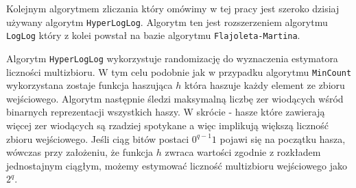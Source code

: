 Kolejnym algorytmem zliczania który omówimy w tej pracy jest szeroko dzisiaj używany algorytm \texttt{HyperLogLog}. Algorytm ten jest rozszerzeniem algorytmu \texttt{LogLog} który z kolei powstał na bazie algorytmu \texttt{Flajoleta-Martina}.

Algorytm \texttt{HyperLogLog} wykorzystuje randomizację do wyznaczenia estymatora liczności multizbioru. W tym celu podobnie jak w przypadku algorytmu \texttt{MinCount} wykorzystana zostaje funkcja haszująca $h$ która haszuje każdy element ze zbioru wejściowego. Algorytm następnie śledzi maksymalną liczbę zer wiodących wśród binarnych reprezentacji wszystkich haszy. W skrócie - hasze które zawierają więcej zer wiodących są rzadziej spotykane a więc implikują większą liczność zbioru wejściowego. Jeśli ciąg bitów postaci $0^{q-1}1$ pojawi się na początku hasza, wówczas przy założeniu, że funkcja $h$ zwraca wartości zgodnie z rozkładem jednostajnym ciągłym, możemy estymować liczność multizbioru wejściowego jako $2^{q}$.

